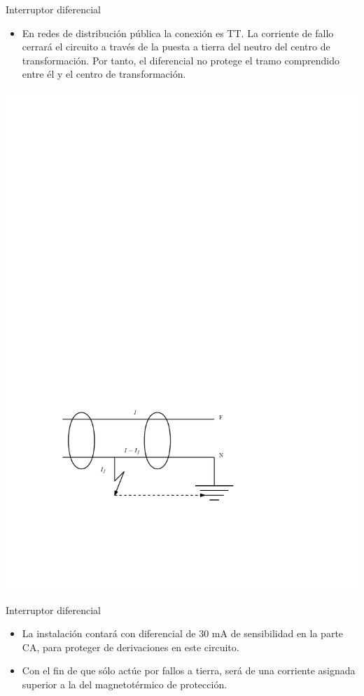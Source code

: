 \documentclass[xcolor={usenames,svgnames,dvipsnames}]{beamer}
\begin{document}
\begin{frame}[label=sec-5-2-6]{Interruptor diferencial}
\begin{itemize}
\item En redes de distribución pública la conexión es TT. La corriente de fallo cerrará el circuito a través de la puesta a tierra del neutro del centro de transformación. Por tanto, el diferencial \alert{no} protege el tramo comprendido entre él y el centro de transformación.
\end{itemize}

\includegraphics[width=.9\linewidth]{../figs/InterruptorDiferencial.pdf}
\end{frame}

\begin{frame}[label=sec-5-2-7]{Interruptor diferencial}
\begin{itemize}
\item La instalación contará con diferencial de 30 mA de sensibilidad en la parte CA, para proteger de derivaciones en este circuito.

\item Con el fin de que sólo actúe por fallos a tierra, será de una corriente asignada superior a la del magnetotérmico de protección.
\end{itemize}
\end{frame}
\end{document}
